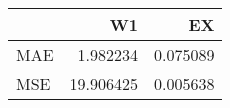 \begin{tabular}{lrr}
\toprule
{} &         W1 &        EX \\
\midrule
MAE &   1.982234 &  0.075089 \\
MSE &  19.906425 &  0.005638 \\
\bottomrule
\end{tabular}
